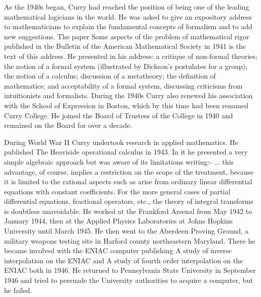 As the 1940s began, Curry had reached the position of being one of the leading mathematical logicians in the world. He was asked to give an expository address to mathematicians to explain the fundamental concepts of formalism and to add new suggestions. The paper Some aspects of the problem of mathematical rigor published in the Bulletin of the American Mathematical Society in 1941 is the text of this address. He presented in his address: a critique of non-formal theories; the notion of a formal system (illustrated by Dickson's postulates for a group); the notion of a calculus; discussion of a metatheory; the definition of mathematics; and acceptability of a formal system, discussing criticisms from intuitionists and formalists. During the 1940s Curry also renewed his association with the School of Expression in Boston, which by this time had been renamed Curry College. He joined the Board of Trustees of the College in 1940 and remained on the Board for over a decade.

During World War II Curry undertook research in applied mathematics. He published The Heaviside operational calculus in 1943. In it he presented a very simple algebraic approach but was aware of its limitations writing:-
... this advantage, of course, implies a restriction on the scope of the treatment, because it is limited to the rational aspects such as arise from ordinary linear differential equations with constant coefficients. For the more general cases of partial differential equations, fractional operators, etc., the theory of integral transforms is doubtless unavoidable.
He worked at the Frankford Arsenal from May 1942 to January 1944, then at the Applied Physics Laboratories at Johns Hopkins University until March 1945. He then went to the Aberdeen Proving Ground, a military weapons testing site in Harford county northeastern Maryland. There he became involved with the ENIAC computer publishing A study of inverse interpolation on the ENIAC and A study of fourth order interpolation on the ENIAC both in 1946. He returned to Pennsylvania State University in September 1946 and tried to persuade the University authorities to acquire a computer, but he failed.

